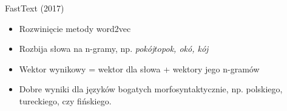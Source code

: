 \documentclass{beamer}
\begin{document}
		


		
		
		
	\begin{frame}{FastText (2017)}
		\begin{itemize}
			\item Rozwinięcie metody word2vec
			\item Rozbija słowa na n-gramy, np.
			\emph{pokój}$to$\emph{pok, okó, kój}
			\item Wektor wynikowy = wektor dla słowa + wektory jego n-gramów 
			\item Dobre wyniki dla języków bogatych morfosyntaktycznie, np. polskiego, tureckiego, czy fińskiego.
		\end{itemize}
	\end{frame}
\end{document}
